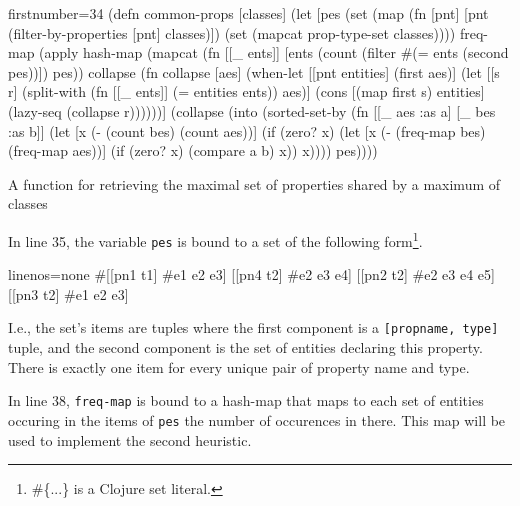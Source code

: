 \documentclass[11pt]{article}
\begin{document}
\begin{listing}[b!]
  \begin{clojurecode*}{firstnumber=34}
(defn common-props [classes]
  (let [pes (set (map (fn [pnt]
                        [pnt (filter-by-properties [pnt] classes)])
                      (set (mapcat prop-type-set classes))))
        freq-map (apply hash-map
                        (mapcat (fn [[_ ents]]
                                  [ents (count (filter #(= ents (second %
                                                       pes))])
                                pes))
        collapse (fn collapse [aes]
                   (when-let [[pnt entities] (first aes)]
                     (let [[s r] (split-with (fn [[_ ents]]
                                               (= entities ents)) aes)]
                       (cons [(map first s) entities]
                             (lazy-seq (collapse r))))))]
    (collapse (into (sorted-set-by
                     (fn [[_ aes :as a] [_ bes :as b]]
                       (let [x (- (count bes) (count aes))]
                         (if (zero? x)
                           (let [x (- (freq-map bes) (freq-map aes))]
                             (if (zero? x)
                               (compare a b)
                               x))
                           x))))
                    pes))))
  \end{clojurecode*}
  \caption{A function for retrieving the maximal set of properties shared by a
    maximum of classes}
  \label{lst:common-props}
\end{listing}

In line 35, the variable \verb|pes| is bound to a set of the following
form\footnote{\textsf{\#\{...\} is a Clojure set literal.}}.

\begin{clojurecode*}{linenos=none}
#{[[pn1 t1] #{e1 e2 e3}]
  [[pn4 t2] #{e2 e3 e4}]
  [[pn2 t2] #{e2 e3 e4 e5}]
  [[pn3 t2] #{e1 e2 e3}]}
\end{clojurecode*}

I.e., the set's items are tuples where the first component is a
\verb|[propname, type]| tuple, and the second component is the set of entities
declaring this property.  There is exactly one item for every unique pair of
property name and type.

In line 38, \verb|freq-map| is bound to a hash-map that maps to each set of
entities occuring in the items of \verb|pes| the number of occurences in there.
This map will be used to implement the second heuristic.
\end{document}

